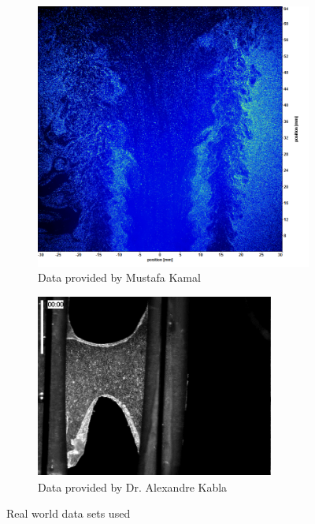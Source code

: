 \documentclass[a4paper,10pt]{article}
\begin{document}
      \begin{figure}[htbp!]
        \centering
        \begin{subfigure}[b]{0.3\textwidth}
          \includegraphics[width=\textwidth]{kamal}
          \caption{Data provided by Mustafa Kamal}
          \label{fig:kamal}
        \end{subfigure}
        \begin{subfigure}[b]{0.3\textwidth}
          \includegraphics[width=\textwidth]{kabla}
          \caption{Data provided by Dr. Alexandre Kabla}
          \label{fig:kabla}
        \end{subfigure}
        \caption{Real world data sets used}
        \label{fig:realworld}
      \end{figure}
      
\end{document}
